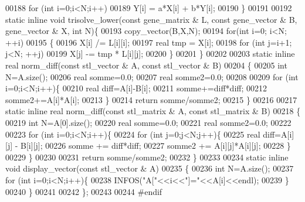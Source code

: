 \begin{DoxyCode}
00188     \textcolor{keywordflow}{for} (\textcolor{keywordtype}{int} i=0;i<N;i++)
00189       Y[i] = a*X[i] + b*Y[i];
00190   \}
00191 
00192   \textcolor{keyword}{static} \textcolor{keyword}{inline} \textcolor{keywordtype}{void} trisolve\_lower(\textcolor{keyword}{const} gene\_matrix & L, \textcolor{keyword}{const} gene\_vector & B, gene\_vector & X, \textcolor{keywordtype}{int} N)\{
00193     copy\_vector(B,X,N);
00194     \textcolor{keywordflow}{for}(\textcolor{keywordtype}{int} i=0; i<N; ++i)
00195     \{
00196       X[i] /= L[i][i];
00197       real tmp = X[i];
00198       \textcolor{keywordflow}{for} (\textcolor{keywordtype}{int} j=i+1; j<N; ++j)
00199         X[j] -= tmp * L[i][j];
00200     \}
00201   \}
00202 
00203   \textcolor{keyword}{static} \textcolor{keyword}{inline} real norm\_diff(\textcolor{keyword}{const} stl\_vector & A, \textcolor{keyword}{const} stl\_vector & B)
00204   \{
00205     \textcolor{keywordtype}{int} N=A.size();
00206     real somme=0.0;
00207     real somme2=0.0;
00208 
00209     \textcolor{keywordflow}{for} (\textcolor{keywordtype}{int} i=0;i<N;i++)\{
00210       real diff=A[i]-B[i];
00211       somme+=diff*diff;
00212       somme2+=A[i]*A[i];
00213     \}
00214     \textcolor{keywordflow}{return} somme/somme2;
00215   \}
00216 
00217   \textcolor{keyword}{static} \textcolor{keyword}{inline} real norm\_diff(\textcolor{keyword}{const} stl\_matrix & A, \textcolor{keyword}{const} stl\_matrix & B)
00218   \{
00219     \textcolor{keywordtype}{int} N=A[0].size();
00220     real somme=0.0;
00221     real somme2=0.0;
00222 
00223     \textcolor{keywordflow}{for} (\textcolor{keywordtype}{int} i=0;i<N;i++)\{
00224       \textcolor{keywordflow}{for} (\textcolor{keywordtype}{int} j=0;j<N;j++)\{
00225         real diff=A[i][j] - B[i][j];
00226         somme += diff*diff;
00227         somme2 += A[i][j]*A[i][j];
00228       \}
00229     \}
00230 
00231     \textcolor{keywordflow}{return} somme/somme2;
00232   \}
00233 
00234   \textcolor{keyword}{static} \textcolor{keyword}{inline} \textcolor{keywordtype}{void} display\_vector(\textcolor{keyword}{const} stl\_vector & A)
00235   \{
00236     \textcolor{keywordtype}{int} N=A.size();
00237     \textcolor{keywordflow}{for} (\textcolor{keywordtype}{int} i=0;i<N;i++)\{
00238       INFOS(\textcolor{stringliteral}{"A["}<<i<<\textcolor{stringliteral}{"]="}<<A[i]<<endl);
00239     \}
00240   \}
00241 
00242 \};
00243 
00244 \textcolor{preprocessor}{#endif}
\end{DoxyCode}
